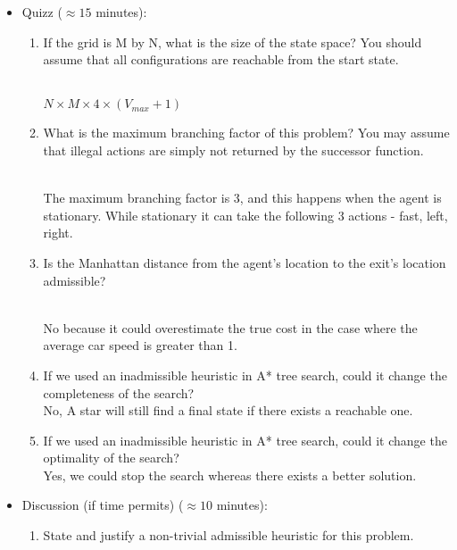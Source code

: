 \documentclass[9pt,a4paper]{extarticle}
\newenvironment{solution}
    {%
    \color{red}
    }
    { 
    \color{black}
    }
\begin{document}
\begin{itemize}
    \item Quizz ($\approx 15$ minutes):
    \begin{enumerate}
    \item If the grid is M by N, what is the size of the state space? You should assume that all configurations are reachable from the start state. 
    \begin{solution}
    \\
    $N \times M \times 4 \times (V_{max} + 1)$
    \end{solution}
    \item What is the maximum branching factor of this problem? You may assume that illegal actions are simply not returned by the successor function.
    \begin{solution}
    \\
    The maximum branching factor is 3, and this happens when the agent is stationary. While stationary it
    can take the following 3 actions - fast, left, right.
    \end{solution}
    \item Is the Manhattan distance from the agent’s location to the exit’s location admissible?
    \begin{solution}
    \\
    No because it could overestimate the true cost in the case where the average car speed is greater than 1.
    \end{solution}
    \item If we used an inadmissible heuristic in A* tree search, could it change the completeness of the search?
    \begin{solution}\\
    No, A star will still find a final state if there exists a reachable one.
    \end{solution}
    \item If we used an inadmissible heuristic in A* tree search, could it change the optimality of the search?
    \begin{solution}\\
    Yes, we could stop the search whereas there exists a better solution.
    \end{solution}
    \end{enumerate}
    \item Discussion (if time permits) ($\approx 10$ minutes):
    \begin{enumerate}
        \item State and justify a non-trivial admissible heuristic for this problem.

\end{enumerate}
\end{itemize}
\end{document}

